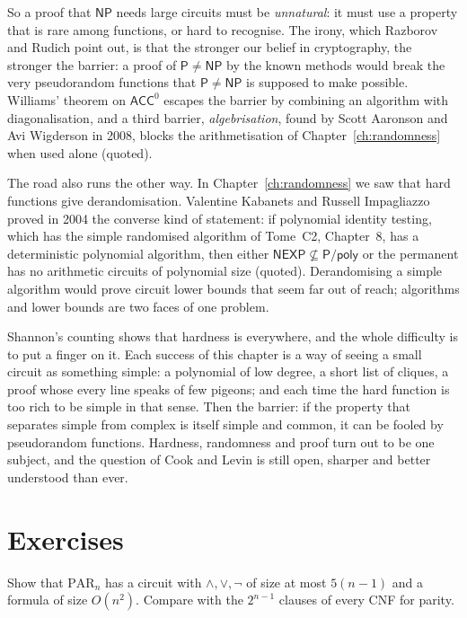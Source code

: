 So a proof that $\mathsf{NP}$ needs large circuits must be \emph{unnatural}: it must use a property that is rare among functions, or hard to recognise. The irony, which Razborov and Rudich point out, is that the stronger our belief in cryptography, the stronger the barrier: a proof of $\mathsf P\ne\mathsf{NP}$ by the known methods would break the very pseudorandom functions that $\mathsf P\ne\mathsf{NP}$ is supposed to make possible. Williams' theorem on $\mathsf{ACC}^0$ escapes the barrier by combining an algorithm with diagonalisation, and a third barrier, \emph{algebrisation}, found by Scott Aaronson and Avi Wigderson in 2008, blocks the arithmetisation of Chapter~\ref{ch:randomness} when used alone (quoted).

The road also runs the other way. In Chapter~\ref{ch:randomness} we saw that hard functions give derandomisation. Valentine Kabanets and Russell Impagliazzo proved in 2004 the converse kind of statement: if polynomial identity testing, which has the simple randomised algorithm of Tome~C2, Chapter~8, has a deterministic polynomial algorithm, then either $\mathsf{NEXP}\not\subseteq\mathsf P/\mathsf{poly}$ or the permanent has no arithmetic circuits of polynomial size (quoted). Derandomising a simple algorithm would prove circuit lower bounds that seem far out of reach; algorithms and lower bounds are two faces of one problem.

\begin{beauty}
Shannon's counting shows that hardness is everywhere, and the whole difficulty is to put a finger on it. Each success of this chapter is a way of seeing a small circuit as something simple: a polynomial of low degree, a short list of cliques, a proof whose every line speaks of few pigeons; and each time the hard function is too rich to be simple in that sense. Then the barrier: if the property that separates simple from complex is itself simple and common, it can be fooled by pseudorandom functions. Hardness, randomness and proof turn out to be one subject, and the question of Cook and Levin is still open, sharper and better understood than ever.
\end{beauty}

\section{Exercises}

\begin{exercise}[$\star$]\label{ex:paritysmall}
Show that $\mathrm{PAR}_n$ has a circuit with $\land,\lor,\lnot$ of size at most $5(n-1)$ and a formula of size $O(n^2)$. Compare with the $2^{n-1}$ clauses of every CNF for parity.
\end{exercise}

